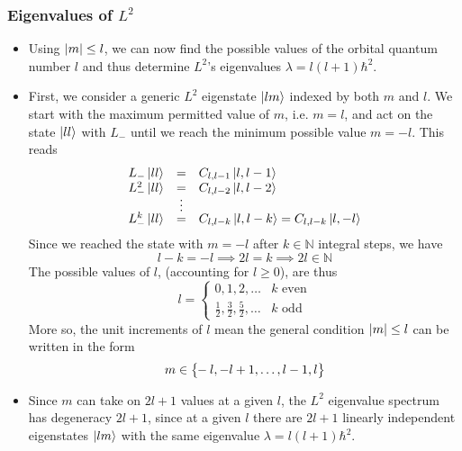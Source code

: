 \documentclass[11pt, a4paper]{article}
\renewcommand{\k}[1]{\ket{#1}}
\begin{document}
\subsubsection{Eigenvalues of $ L^{2} $}
\begin{itemize}
	\item Using $ \abs{m} \leq l $, we can now find the possible values of the orbital quantum number $ l $ and thus determine $ L^{2} $'s eigenvalues $ \lambda = l (l+1)\hbar^{2} $. 
	
	\item First, we consider a generic $ L^{2} $ eigenstate $ \ket{lm} $ indexed by both $ m $ and $ l $. We start with the maximum permitted value of $ m $, i.e. $ m = l $, and act on the state $ \ket{ll} $ with $ L_{-} $ until we reach the minimum possible value $ m = -l $. This reads
	\begin{equation*}
		\begin{array}{lcl}
			L_{-}\k{ll}     & = & C_{l,l-1}\k{l, l-1}\\
			L^{2}_{-}\k{ll} & = & C_{l,l-2}\k{l, l-2}\\[-0.3em]
			& \vdots &\\[-0.3em]
			L^{k}_{-}\k{ll} & = & C_{l,l-k}\k{l, l-k} =  C_{l,l-k}\k{l, -l}\\
		\end{array}
	\end{equation*}
	Since we reached the state with $ m = -l $ after $ k \in \mathbb{N}$ integral steps, we have
	\begin{equation*}
		l - k = - l \implies 2l = k \implies 2l \in \mathbb{N}
	\end{equation*}
	The possible values of $ l $, (accounting for $ l \geq 0 $), are thus
	\begin{equation*}
		l = 
		\begin{cases}
			0, 1, 2, \ldots & k \text{ even}\\
			\frac{1}{2}, \frac{3}{2}, \frac{5}{2}, \ldots & k \text{ odd}
		\end{cases}
	\end{equation*}
	More so, the unit increments of $ l $ mean the general condition $ \abs{m} \leq l $ can be written in the form
	\begin{equation*}
		m \in \big\{\hspace{-0.3em}-l, -l+1, \ldots, l-1, l\big\}
	\end{equation*}
	
	\item Since $ m $ can take on $ 2l + 1 $ values at a given $ l $, the $ L^{2} $ eigenvalue spectrum has degeneracy $ 2l + 1 $, since at a given $ l $ there are $ 2l + 1 $ linearly independent eigenstates $ \ket{lm} $ with the same eigenvalue $ \lambda = l (l+1)\hbar^{2} $. 
	

\end{itemize}
\end{document}
